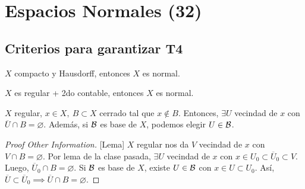 
\section{Espacios Normales (32)}

\subsection{Criterios para garantizar T4}

\begin{prop}
	$X$ compacto y Hausdorff, entonces $X$ es normal.
\end{prop}

\begin{prop}
	$X$ es regular + 2do contable, entonces $X$ es normal.
\end{prop}

\begin{lemma}
	$X$ regular, $x \in X,\ B \subset X$ cerrado tal que $x \not\in B$. Entonces, $\exists U$ vecindad de $x$ con $\overline{U} \cap B = \varnothing$. Además, si $\mathcal{B}$ es base de $X$, podemos elegir $U \in \mathcal{B}$.
\end{lemma}
\begin{proof}[Proof Other Information][Lema]
	$X$ regular nos da $V$ vecindad de $x$ con $V \cap B = \varnothing$. Por lema de la clase pasada, $\exists U$ vecindad de $x$ con $x \in U_{0} \subset \overline{U}_{0} \subset V$. Luego, $\overline{U}_{0} \cap B = \varnothing$. Si $\mathcal{B}$ es base de $X$, existe $U \in \mathcal{B}$ con $x \in U \subset U_{0}$. Así, $\overline{U} \subset \overline{U}_{0} \implies \overline{U} \cap B = \varnothing$.
\end{proof}

